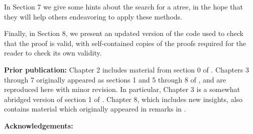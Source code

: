 In Section 7 we give some hints about the search for a atree,
in the hope that they will help others endeavoring to apply these methods.

Finally, in Section 8, we present an updated version of
the code used to check that the proof is valid,
with self-contained copies of the proofs required for the reader
to check its own validity.
\vskip 8pt

\noindent\textbf {Prior publication:} Chapter 2 includes material from section 0 of \cite{GMT}.
Chapters 3 through 7 originally appeared as sections 1 and 5 through 8 of \cite{GMT},
and are reproduced here with minor revision.  In particular, Chapter 3 is a somewhat abridged version of section 1 of \cite{GMT}.
Chapter 8, which includes new insights, also contains material which originally appeared in remarks in \cite{GMT}.

\vskip 8pt

\noindent\textbf {Acknowledgements:}
